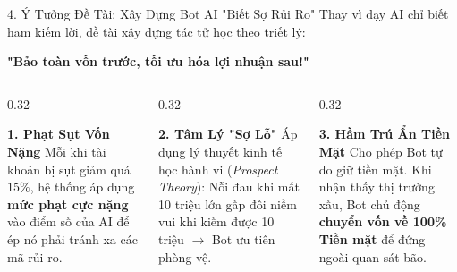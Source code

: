 \documentclass[aspectratio=169, 10pt]{beamer}
\begin{document}
\begin{frame}{4. Ý Tưởng Đề Tài: Xây Dựng Bot AI "Biết Sợ Rủi Ro"}
  Thay vì dạy AI chỉ biết ham kiếm lời, đề tài xây dựng tác tử học theo triết lý:
  \begin{center}
    {\Large \color{MainNavy}\textbf{"Bảo toàn vốn trước, tối ưu hóa lợi nhuận sau!"}}
  \end{center}

  \vspace{1ex}
  \begin{columns}[t]
    \begin{column}{0.32\textwidth}
      \begin{block}{\textbf{1. Phạt Sụt Vốn Nặng}}
        \small
        Mỗi khi tài khoản bị sụt giảm quá $15\%$, hệ thống áp dụng \textbf{mức phạt cực nặng} vào điểm số của AI để ép nó phải tránh xa các mã rủi ro.
      \end{block}
    \end{column}

    \begin{column}{0.32\textwidth}
      \begin{block}{\textbf{2. Tâm Lý "Sợ Lỗ"}}
        \small
        Áp dụng lý thuyết kinh tế học hành vi (\textit{Prospect Theory}): Nỗi đau khi mất 10 triệu lớn gấp đôi niềm vui khi kiếm được 10 triệu $\to$ Bot ưu tiên phòng vệ.
      \end{block}
    \end{column}

    \begin{column}{0.32\textwidth}
      \begin{block}{\textbf{3. Hầm Trú Ẩn Tiền Mặt}}
        \small
        Cho phép Bot tự do giữ tiền mặt. Khi nhận thấy thị trường xấu, Bot chủ động \textbf{chuyển vốn về 100\% Tiền mặt} để đứng ngoài quan sát bão.
      \end{block}
    \end{column}
  \end{columns}
\end{frame}
\end{document}
